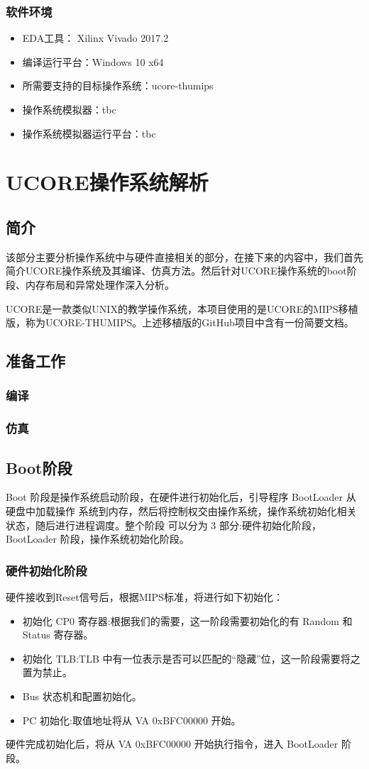 \documentclass[11pt,utf8]{article}
\begin{document}
\subsubsection{软件环境}
\begin{itemize}
\item EDA工具： Xilinx Vivado 2017.2
\item 编译运行平台：Windows 10 x64
\item 所需要支持的目标操作系统：ucore-thumips
\item 操作系统模拟器：tbc
\item 操作系统模拟器运行平台：tbc
\end{itemize}

\section{UCORE操作系统解析}
\subsection{简介}
该部分主要分析操作系统中与硬件直接相关的部分，在接下来的内容中，我们首先简介UCORE操作系统及其编译、仿真方法。然后针对UCORE操作系统的boot阶段、内存布局和异常处理作深入分析。

UCORE是一款类似UNIX的教学操作系统，本项目使用的是UCORE的MIPS移植版，称为UCORE-THUMIPS。上述移植版的GitHub项目中含有一份简要文档。

\subsection{准备工作}
\subsubsection{编译}
\subsubsection{仿真}
\subsection{Boot阶段}
Boot 阶段是操作系统启动阶段，在硬件进行初始化后，引导程序 BootLoader 从硬盘中加载操作 系统到内存，然后将控制权交由操作系统，操作系统初始化相关状态，随后进行进程调度。整个阶段 可以分为 3 部分:硬件初始化阶段，BootLoader 阶段，操作系统初始化阶段。
\subsubsection{硬件初始化阶段}
硬件接收到Reset信号后，根据MIPS标准，将进行如下初始化：
\begin{itemize}
\item 初始化 CP0 寄存器:根据我们的需要，这一阶段需要初始化的有 Random 和 Status 寄存器。 
\item 初始化 TLB:TLB 中有一位表示是否可以匹配的“隐藏”位，这一阶段需要将之置为禁止。 
\item Bus 状态机和配置初始化。
\item PC 初始化:取值地址将从 VA 0xBFC00000 开始。
\end{itemize}
硬件完成初始化后，将从 VA 0xBFC00000 开始执行指令，进入 BootLoader 阶段。
\end{document}
